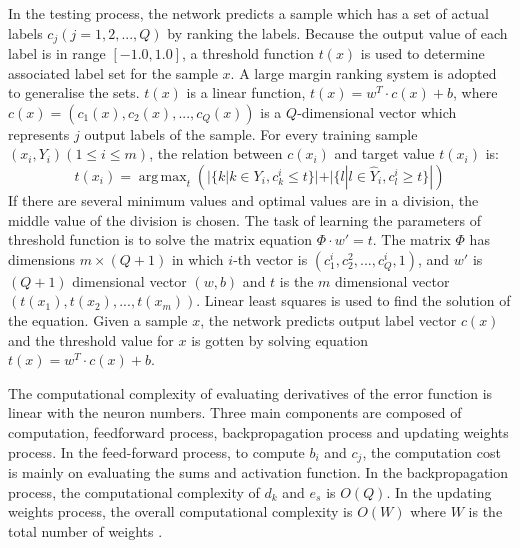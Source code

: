 In the testing process, the network predicts a sample which has a set of actual labels $c_{j} (j = 1,2,...,Q)$ by ranking the labels. Because the output value of each label is in range $[-1.0,1.0]$, a threshold function $t(x)$ is used to determine associated label set for the sample $x$. A large margin ranking system \citep{elisseeff2001kernel} is adopted to generalise the sets. $t(x)$ is a linear function, $t(x) = w^T\cdot c(x) + b$, where $c(x) = (c_{1}(x), c_{2}(x),...,c_{Q}(x))$ is a $Q$-dimensional vector which represents $j$ output labels of the sample. For every training sample $(x_{i}, Y_{i}) (1 \leq i \leq m)$, the relation between $c(x_{i})$ and target value $t(x_{i})$ is:
\begin{equation}\label{eq:MultiLableThreshFunc}
t(x_{i}) =  \operatorname{arg\,max}_t (|\{k|k \in Y_{i}, c_{k}^i \leq t\}| + |\{l|l \in \hat{Y}_{i}, c_{l}^i \geq t\}|) 
\end{equation}
If there are several minimum values and optimal values are in a division, the middle value of the division is chosen. The task of learning the parameters of threshold function is to solve the matrix equation $\Phi \cdot w' = t$. The matrix $\Phi$ has dimensions $m \times (Q + 1)$ in which $i$-th vector is $(c_{1}^i, c_{2}^2,...,c_{Q}^i,1)$, and $w'$ is $(Q+1)$ dimensional vector $(w,b)$ and $t$ is the $m$ dimensional vector $(t(x_{1}), t(x_{2}),...,t(x_{m}))$. Linear least squares is used to find the solution of the equation. Given a sample $x$, the network predicts output label vector $c(x)$ and the threshold value for $x$ is gotten by solving equation $t(x) = w^T \cdot c(x) + b$.

The computational complexity of evaluating derivatives of the error function is linear with the neuron numbers. Three main components are composed of computation, feedforward process, backpropagation process and updating weights process. In the feed-forward process, to compute $b_{i}$ and $c_{j}$, the computation cost is mainly on evaluating the sums and activation function. In the backpropagation process, the computational complexity of $d_{k}$ and $e_{s}$ is $O(Q)$. In the updating weights process, the overall computational complexity is $O(W)$ where $W$ is the total number of weights . 





















